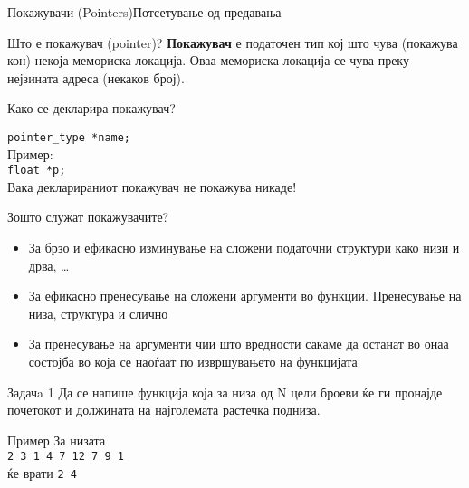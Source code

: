 \begin{frame}[fragile,shrink=10]{Покажувачи (Pointers)}{Потсетување од
предавања}
  \begin{block}{Што е покажувач (pointer)?}
    \textbf{Покажувач} е \alert{податочен тип} кој што чува (покажува кон)
    некоја мемориска локација. Оваа мемориска локација се чува преку нејзината адреса (некаков
    број).
  \end{block}
  \begin{block}{Како се декларира покажувач?}
  
    \texttt{pointer\_type *name;}\\
    Пример:\\
    \texttt{float *p;}\\
    \alert{Вака декларираниот покажувач не покажува никаде!}
  \end{block}
  \begin{block}{Зошто служат покажувачите?}
    \begin{itemize}
      \item За брзо и ефикасно изминување на сложени податочни структури како
      низи и дрва, \ldots
      \item За ефикасно пренесување на сложени аргументи во функции. Пренесување
      на низа, структура и слично
      \item За пренесување на аргументи чии што вредности сакаме да останат во
      онаа состојба во која се наоѓаат по извршувањето на функцијата
    \end{itemize}
  \end{block}
  
\end{frame}

\begin{frame}{Задачa 1}
Да се напише функција која за низа од N цели броеви ќе ги пронајде почетокот и
должината на најголемата растечка подниза.
\begin{exampleblock}{Пример}
За низата\\
\texttt{2 3 {\color{red}1 4 7 12} 7 9 1}\\
ќе врати \texttt{2 4}
\end{exampleblock}
\end{frame}

